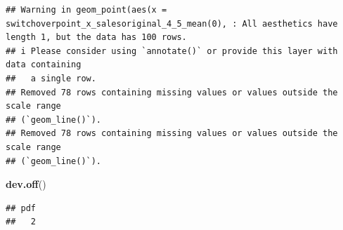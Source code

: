 \documentclass[
]{article}
\newenvironment{Shaded}{\begin{snugshade}}{\end{snugshade}}
\newcommand{\FunctionTok}[1]{\textcolor[rgb]{0.13,0.29,0.53}{\textbf{#1}}}
\newcommand{\NormalTok}[1]{#1}
\begin{document}
\begin{verbatim}
## Warning in geom_point(aes(x = switchoverpoint_x_salesoriginal_4_5_mean(0), : All aesthetics have length 1, but the data has 100 rows.
## i Please consider using `annotate()` or provide this layer with data containing
##   a single row.
## Removed 78 rows containing missing values or values outside the scale range
## (`geom_line()`).
## Removed 78 rows containing missing values or values outside the scale range
## (`geom_line()`).
\end{verbatim}

\begin{Shaded}
\begin{Highlighting}[]
\FunctionTok{dev.off}\NormalTok{()}
\end{Highlighting}
\end{Shaded}

\begin{verbatim}
## pdf 
##   2
\end{verbatim}
\end{document}
